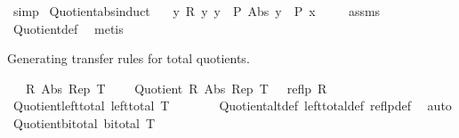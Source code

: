 \begin{isabellebody}
\ simp%
\endisatagproof
{\isafoldproof}%
%
\isadelimproof
\isanewline
%
\endisadelimproof
\isanewline
{}\isamarkupfalse%
\ Quotient{\isacharunderscore}{\kern0pt}abs{\isacharunderscore}{\kern0pt}induct{\isacharcolon}{\kern0pt}\isanewline
\ \ \ {\isachardoublequoteopen}{\isasymAnd}y{\isachardot}{\kern0pt}\ R\ y\ y\ {\isasymLongrightarrow}\ P\ {\isacharparenleft}{\kern0pt}Abs\ y{\isacharparenright}{\kern0pt}{\isachardoublequoteclose}\ \ {\isachardoublequoteopen}P\ x{\isachardoublequoteclose}\isanewline
%
\isadelimproof
\ \ %
\endisadelimproof
%
\isatagproof
{}\isamarkupfalse%
\ {}\ assms\ \isamarkupfalse%
\ Quotient{\isacharunderscore}{\kern0pt}def\ \isamarkupfalse%
\ metis%
\endisatagproof
{\isafoldproof}%
%
\isadelimproof
\isanewline
%
\endisadelimproof
\isanewline
{}\isamarkupfalse%
%
\begin{isamarkuptext}%
Generating transfer rules for total quotients.%
\end{isamarkuptext}\isamarkuptrue%
\isamarkupfalse%
\isanewline
\ \ \ R\ Abs\ Rep\ T\isanewline
\ \ \ {}{\isacharcolon}{\kern0pt}\ {\isachardoublequoteopen}Quotient\ R\ Abs\ Rep\ T{\isachardoublequoteclose}\ \ {}{\isacharcolon}{\kern0pt}\ {\isachardoublequoteopen}reflp\ R{\isachardoublequoteclose}\isanewline
{}\isanewline
\isanewline
{}\isamarkupfalse%
\ Quotient{\isacharunderscore}{\kern0pt}left{\isacharunderscore}{\kern0pt}total{\isacharcolon}{\kern0pt}\ {\isachardoublequoteopen}left{\isacharunderscore}{\kern0pt}total\ T{\isachardoublequoteclose}\isanewline
%
\isadelimproof
\ \ %
\endisadelimproof
%
\isatagproof
{}\isamarkupfalse%
\ {}\ {}\ \isamarkupfalse%
\ Quotient{\isacharunderscore}{\kern0pt}alt{\isacharunderscore}{\kern0pt}def\ left{\isacharunderscore}{\kern0pt}total{\isacharunderscore}{\kern0pt}def\ reflp{\isacharunderscore}{\kern0pt}def\ \isamarkupfalse%
\ auto%
\endisatagproof
{\isafoldproof}%
%
\isadelimproof
\isanewline
%
\endisadelimproof
\isanewline
{}\isamarkupfalse%
\ Quotient{\isacharunderscore}{\kern0pt}bi{\isacharunderscore}{\kern0pt}total{\isacharcolon}{\kern0pt}\ {\isachardoublequoteopen}bi{\isacharunderscore}{\kern0pt}total\ T{\isachardoublequoteclose}\isanewline
%
\isadelimproof
\ \ %
\endisadelimproof
%
\isatagproof
{}\isamarkupfalse%
\ {}\ {}\ \isamarkupfalse%

\end{isabellebody}
